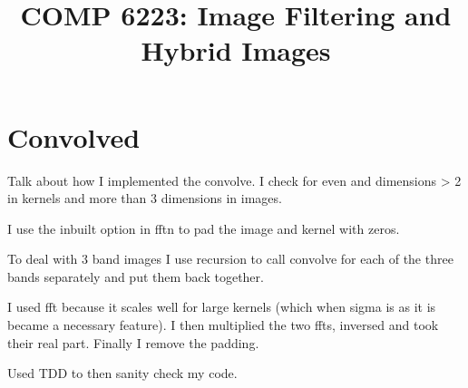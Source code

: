 \documentclass[a4paper,10pt]{article}
\title{COMP 6223: Image Filtering and Hybrid Images}
\date{}
\author{}
\begin{document}
\maketitle
\thispagestyle{fancy}

\section{Convolved}
Talk about how I implemented the convolve. I check for even and dimensions > 2
in kernels and more than 3 dimensions in images.

I use the inbuilt option in fftn to pad the image and kernel with zeros.

To deal with 3 band images I use recursion to call convolve for each of the three
bands separately and put them back together.

I used fft because it scales well for large kernels (which when sigma is as it is
became a necessary feature). I then multiplied the two ffts, inversed and took
their real part. Finally I remove the padding.

Used TDD to then sanity check my code.
\end{document}
